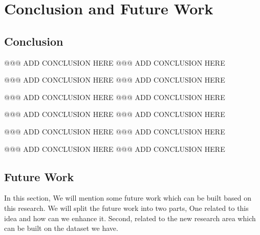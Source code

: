 \chapter{Conclusion and Future Work}\label{cha:concl-future-work}



\section{Conclusion}\label{sec:conclusion}

@@@ ADD CONCLUSION HERE
@@@ ADD CONCLUSION HERE

@@@ ADD CONCLUSION HERE
@@@ ADD CONCLUSION HERE

@@@ ADD CONCLUSION HERE
@@@ ADD CONCLUSION HERE

@@@ ADD CONCLUSION HERE
@@@ ADD CONCLUSION HERE

@@@ ADD CONCLUSION HERE
@@@ ADD CONCLUSION HERE

@@@ ADD CONCLUSION HERE
@@@ ADD CONCLUSION HERE

\clearpage

\section{Future Work}

In this section, We will mention some future work which can be built based on this research. We will split the future work into two parts, One related to this idea and how can we enhance it. Second, related to the new research area which can be built on the dataset we have.


